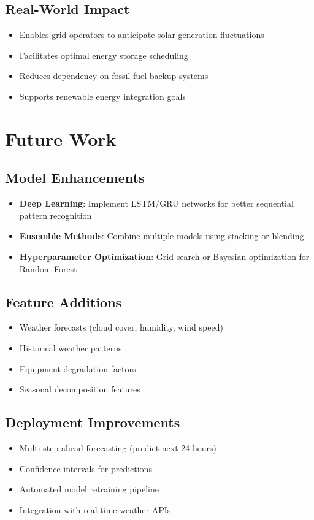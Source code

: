 \documentclass[12pt,a4paper]{article}
\begin{document}
\subsection{Real-World Impact}
\begin{itemize}
    \item Enables grid operators to anticipate solar generation fluctuations
    \item Facilitates optimal energy storage scheduling
    \item Reduces dependency on fossil fuel backup systems
    \item Supports renewable energy integration goals
\end{itemize}

\section{Future Work}

\subsection{Model Enhancements}
\begin{itemize}
    \item \textbf{Deep Learning}: Implement LSTM/GRU networks for better sequential pattern recognition
    \item \textbf{Ensemble Methods}: Combine multiple models using stacking or blending
    \item \textbf{Hyperparameter Optimization}: Grid search or Bayesian optimization for Random Forest
\end{itemize}

\subsection{Feature Additions}
\begin{itemize}
    \item Weather forecasts (cloud cover, humidity, wind speed)
    \item Historical weather patterns
    \item Equipment degradation factors
    \item Seasonal decomposition features
\end{itemize}

\subsection{Deployment Improvements}
\begin{itemize}
    \item Multi-step ahead forecasting (predict next 24 hours)
    \item Confidence intervals for predictions
    \item Automated model retraining pipeline
    \item Integration with real-time weather APIs
\end{itemize}
\end{document}
